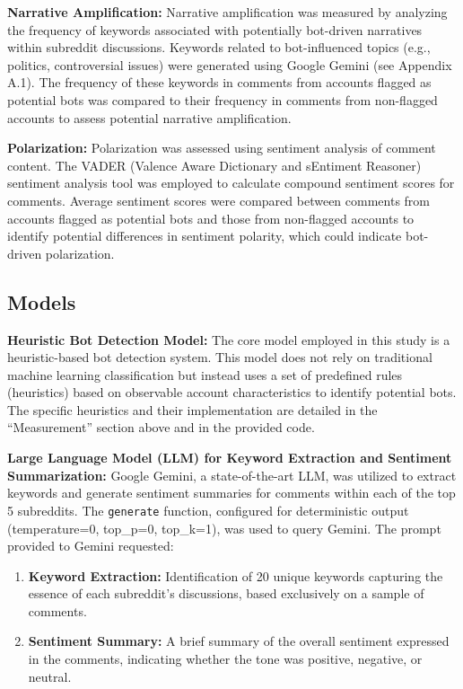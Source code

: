 \documentclass[
  12pt,
  letterpaper,
  DIV=11,
  numbers=noendperiod]{scrartcl}
\providecommand{\tightlist}{%
  \setlength{\itemsep}{0pt}\setlength{\parskip}{0pt}}\usepackage{longtable,booktabs,array}
\begin{document}
\textbf{Narrative Amplification:} Narrative amplification was measured
by analyzing the frequency of keywords associated with potentially
bot-driven narratives within subreddit discussions. Keywords related to
bot-influenced topics (e.g., politics, controversial issues) were
generated using Google Gemini (see Appendix A.1). The frequency of these
keywords in comments from accounts flagged as potential bots was
compared to their frequency in comments from non-flagged accounts to
assess potential narrative amplification.

\textbf{Polarization:} Polarization was assessed using sentiment
analysis of comment content. The VADER (Valence Aware Dictionary and
sEntiment Reasoner) sentiment analysis tool was employed to calculate
compound sentiment scores for comments. Average sentiment scores were
compared between comments from accounts flagged as potential bots and
those from non-flagged accounts to identify potential differences in
sentiment polarity, which could indicate bot-driven polarization.

\subsection{Models}\label{models}

\textbf{Heuristic Bot Detection Model:} The core model employed in this
study is a heuristic-based bot detection system. This model does not
rely on traditional machine learning classification but instead uses a
set of predefined rules (heuristics) based on observable account
characteristics to identify potential bots. The specific heuristics and
their implementation are detailed in the ``Measurement'' section above
and in the provided code.

\textbf{Large Language Model (LLM) for Keyword Extraction and Sentiment
Summarization:} Google Gemini, a state-of-the-art LLM, was utilized to
extract keywords and generate sentiment summaries for comments within
each of the top 5 subreddits. The \texttt{generate} function, configured
for deterministic output (temperature=0, top\_p=0, top\_k=1), was used
to query Gemini. The prompt provided to Gemini requested:

\begin{enumerate}
\def\labelenumi{\arabic{enumi}.}
\tightlist
\item
  \textbf{Keyword Extraction:} Identification of 20 unique keywords
  capturing the essence of each subreddit's discussions, based
  exclusively on a sample of comments.
\item
  \textbf{Sentiment Summary:} A brief summary of the overall sentiment
  expressed in the comments, indicating whether the tone was positive,
  negative, or neutral.
\end{enumerate}
\end{document}
